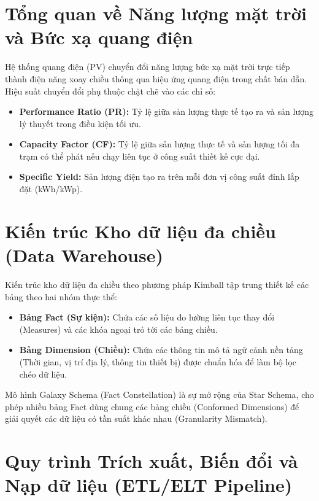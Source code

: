 \documentclass[12pt, a4paper]{report}
\begin{document}
\section{Tổng quan về Năng lượng mặt trời và Bức xạ quang điện}
\label{sec:solar_theory}

Hệ thống quang điện (PV) chuyển đổi năng lượng bức xạ mặt trời trực tiếp thành điện năng xoay chiều thông qua hiệu ứng quang điện trong chất bán dẫn. Hiệu suất chuyển đổi phụ thuộc chặt chẽ vào các chỉ số:
\begin{itemize}[noitemsep]
    \item \textbf{Performance Ratio (PR):} Tỷ lệ giữa sản lượng thực tế tạo ra và sản lượng lý thuyết trong điều kiện tối ưu.
    \item \textbf{Capacity Factor (CF):} Tỷ lệ giữa sản lượng thực tế và sản lượng tối đa trạm có thể phát nếu chạy liên tục ở công suất thiết kế cực đại.
    \item \textbf{Specific Yield:} Sản lượng điện tạo ra trên mỗi đơn vị công suất đỉnh lắp đặt (kWh/kWp).
\end{itemize}

\section{Kiến trúc Kho dữ liệu đa chiều (Data Warehouse)}
\label{sec:dwh_theory}

Kiến trúc kho dữ liệu đa chiều theo phương pháp Kimball tập trung thiết kế các bảng theo hai nhóm thực thể:
\begin{itemize}[noitemsep]
    \item \textbf{Bảng Fact (Sự kiện):} Chứa các số liệu đo lường liên tục thay đổi (Measures) và các khóa ngoại trỏ tới các bảng chiều.
    \item \textbf{Bảng Dimension (Chiều):} Chứa các thông tin mô tả ngữ cảnh nền tảng (Thời gian, vị trí địa lý, thông tin thiết bị) được chuẩn hóa để làm bộ lọc chéo dữ liệu.
\end{itemize}
Mô hình Galaxy Schema (Fact Constellation) là sự mở rộng của Star Schema, cho phép nhiều bảng Fact dùng chung các bảng chiều (Conformed Dimensions) để giải quyết các dữ liệu có tần suất khác nhau (Granularity Mismatch).

\section{Quy trình Trích xuất, Biến đổi và Nạp dữ liệu (ETL/ELT Pipeline)}
\label{sec:etl_theory}
\end{document}
